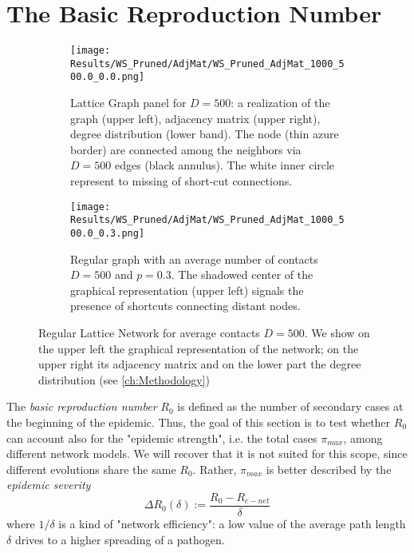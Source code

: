 \documentclass[a4paper,10pt]{book} %
\theoremstyle{definition}
\begin{document}
\section{The Basic Reproduction Number}
\label{sec:res_RegLat}
\begin{figure}[ht]
	\begin{subfigure}[t]{0.48\linewidth}
		\centering
		\texttt{[image: Results/WS\_Pruned/AdjMat/WS\_Pruned\_AdjMat\_1000\_500.0\_0.0.png]}
		\caption{Lattice Graph panel for $D = 500$: a realization of the graph (upper left), adjacency matrix (upper right), degree distribution (lower band). The node (thin azure border) are connected among the neighbors via $ D = 500$ edges (black annulus). The white inner circle represent to missing of short-cut connections.} 
		\label{fig:net_RegLat_D500}
	\end{subfigure} 
	\hfill
	\begin{subfigure}[t]{0.48\linewidth}
		\centering
		\texttt{[image: Results/WS\_Pruned/AdjMat/WS\_Pruned\_AdjMat\_1000\_500.0\_0.3.png]}
		\caption{Regular graph with an average number of contacts $D = 500$ and $p = 0.3$.
		The shadowed center of the graphical representation (upper left) signals the presence of shortcuts connecting distant nodes.}
		\label{fig:net_RegLat_D500_p0.3}
	\end{subfigure}
	\caption{Regular Lattice Network for average contacts $ D = 500$. We show on the upper left the graphical representation of the network; on the upper right its adjacency matrix and on the lower part the degree distribution (see \autoref{ch:Methodology})}
	\label{fig:net_RegLat}
\end{figure}
The \textit{basic reproduction number} $R_0$ is defined as the number of secondary cases at the beginning of the epidemic. Thus, the goal of this section is to test whether $R_0$ can account also for the "epidemic strength", i.e. the total cases $ \pi_{max}$, among different network models. We will recover that it is not suited for this scope, since different evolutions share the same $ R_0$. 
Rather, $ \pi_{max}$ is better described by the \textit{epidemic severity}  
\begin{equation}
	\Delta R_0(\delta):= \frac{R_0 - R_{c-net}}{\delta}
\end{equation}
where $1/\delta$ is a kind of "network efficiency": a low value of the average path length $ \delta$  drives to a higher spreading of a pathogen.
\end{document}

